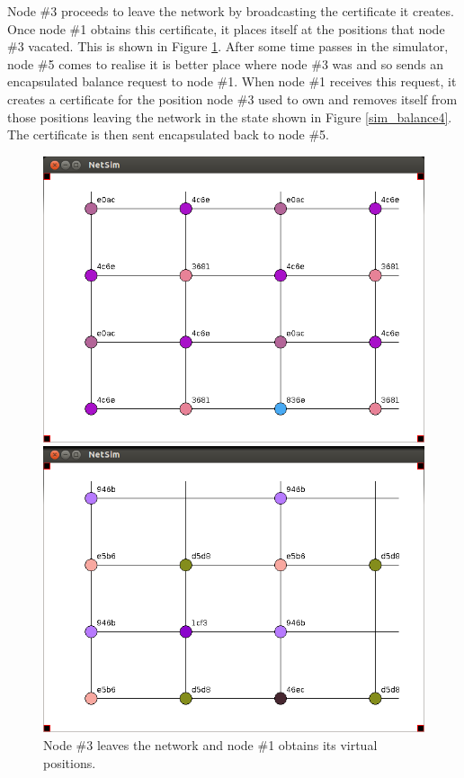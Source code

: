 \documentclass[ %
                    author={Luke Murray},
                supervisor={Dr. Simon Hollis},
                     title={Shadow Peer-to-Peer Networks},
                  subtitle={},
                    degree={MEng},
                      year={2013} ]{thesis}
\begin{document}
Node \#3 proceeds to leave the network by broadcasting the certificate it creates. Once node \#1 obtains this certificate, it places itself at the positions that node \#3 vacated. This is shown in Figure \ref{sim_balance3}. After some time passes in the simulator, node \#5 comes to realise it is better place where node \#3 was and so sends an encapsulated balance request to node \#1. When node \#1 receives this request, it creates a certificate for the position node \#3 used to own and removes itself from those positions leaving the network in the state shown in Figure \ref{sim_balance4}. The certificate is then sent encapsulated back to node \#5.

\begin{figure}[h]
    \centering
    \begin{minipage}[b]{0.45\linewidth}
        \centering
        \includegraphics[width=\linewidth]{sim_pics/balance_6.png}
        \caption{Node \#3 leaves the network and node \#1 obtains its virtual positions.}
        \label{sim_balance3}
    \end{minipage}
    \hspace{0.5cm}
    \begin{minipage}[b]{0.45\linewidth}
        \centering
        \includegraphics[width=\linewidth]{sim_pics/expand_7.png}

\end{minipage}
\end{figure}
\end{document}
